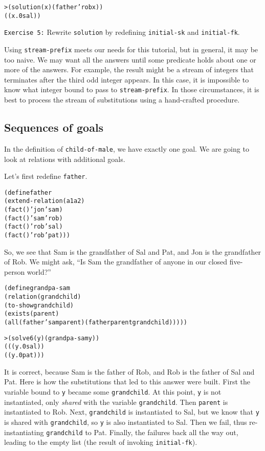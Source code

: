 \begin{alltt}
> (solution (x) (father 'rob x))
((x.0 sal))
\end{alltt}

\noindent
\texttt{Exercise 5:} Rewrite \texttt{solution} by redefining
\texttt{initial-sk} and \texttt{initial-fk}.\endofexercise

Using \texttt{stream-prefix} meets our needs for this tutorial, but in
general, it may be too naive.  We may want all the answers until some
predicate holds about one or more of the answers.  For example, the
result might be a stream of integers that terminates after the third odd
integer appears.  In this case, it is impossible to know what integer bound
to pass to \texttt{stream-prefix}.  In those circumstances, it is best
to process the stream of substitutions using a hand-crafted procedure.

\subsection{Sequences of goals}

In the definition of \texttt{child-of-male}, we have exactly one
goal.  We are going to look at relations with additional
goals.

Let's first redefine \texttt{father}.

\begin{alltt}
(define father
  (extend-relation (a1 a2)
    (fact () 'jon 'sam)
    (fact () 'sam 'rob)
    (fact () 'rob 'sal)
    (fact () 'rob 'pat)))
\end{alltt}

So, we see that Sam is the grandfather of Sal and Pat, and Jon is the
grandfather of Rob.  We might ask, ``Is Sam the grandfather of anyone
in our closed five-person world?''

\begin{alltt}
(define grandpa-sam
  (relation (grandchild)
    (to-show grandchild)
    (exists (parent)
      (all (father 'sam parent) (father parent grandchild)))))
\end{alltt}

\begin{alltt}
> (solve 6 (y) (grandpa-sam y))
(((y.0 sal))
 ((y.0 pat)))
\end{alltt}

It is correct, because Sam is the father of Rob, and Rob is the
father of Sal and Pat.  Here is how the substitutions that led to this
answer were built.  First the variable bound to \texttt{y} became some
\texttt{grandchild}.  At this point, \texttt{y} is not instantiated,
only \emph{shared} with the variable \texttt{grandchild}.  Then
\texttt{parent} is instantiated to Rob.  Next, \texttt{grandchild} is
instantiated to Sal, but we know that \texttt{y} is shared with
\texttt{grandchild}, so \texttt{y} is also instantiated to Sal.  Then
we fail, thus re-instantiating \texttt{grandchild} to Pat.  Finally,
the failures back all the way out, leading to the empty list (the
result of invoking \texttt{initial-fk}).

